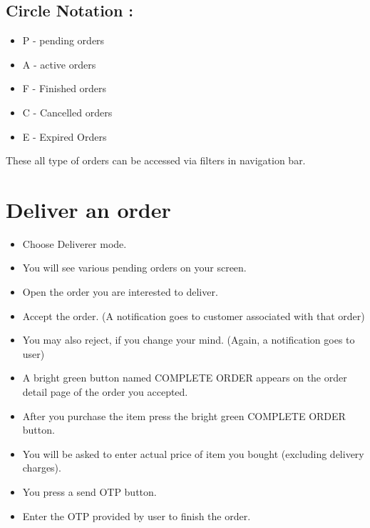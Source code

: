 \documentclass{report}
\begin{document}

\subsection{Circle Notation :}
\begin{itemize}[label=$\circ$]
\item P - pending orders
\item A - active orders
\item F - Finished orders
\item C - Cancelled orders
\item E - Expired Orders 
\end{itemize}
These all type of orders can be accessed via filters in navigation bar.

\section{Deliver an order}
\begin{itemize}[label=$\rightarrow$]
\item Choose Deliverer mode.
\item You will see various pending orders on your screen.
\item Open the order you are interested to deliver.
\item Accept the order. (A notification goes to customer associated with that order)
\item You may also reject, if you change your mind. (Again, a notification goes to user)
\item A bright green button named COMPLETE ORDER appears on the order detail page of the order you accepted.
\item After you purchase the item press the bright green COMPLETE ORDER button.
\item You will be asked to enter actual price of item you bought (excluding delivery charges).
\item You press a send OTP button.
\item Enter the OTP provided by user to finish the order.

\end{itemize}
\end{document}
